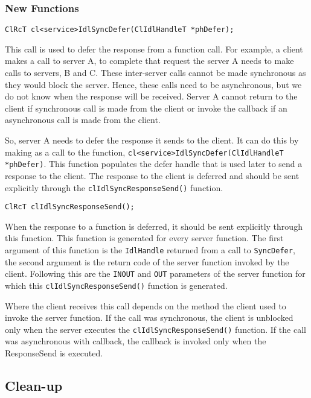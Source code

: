 \begin{flushleft}
\begin{enumerate}
\end{enumerate}

\subsubsection{New Functions}
{\tt{ClRcT cl<service>IdlSyncDefer(ClIdlHandleT *phDefer);}}
\par
This call is used to defer the response from a function call. For example, a client makes a call to server A, to complete that request the server A 
needs to make calls to servers, B and C. These inter-server calls cannot be made synchronous as they would block the server. Hence, these calls need to be 
asynchronous, but we do not know when the response will be received. Server A cannot return to the client if synchronous call is made from the client 
or invoke the callback if an asynchronous call is made from the client.
\par
So, server A needs to defer the response it sends to the client. It can do this by making as a call to the function, 
{\tt{cl<service>IdlSyncDefer(ClIdlHandleT *phDefer)}}. This function populates the defer handle that is used later to send a response to the 
client. The response to the client is deferred and should be sent explicitly through the {\tt{clIdlSyncResponseSend()}} function.
\par

{\tt{ClRcT clIdlSyncResponseSend();}}

\par	
	When the response to a function is deferred, it should be sent explicitly through this function.
This function is generated for every server function. The first argument of this function is the {\tt{IdlHandle}} returned from a call to 
{\tt{SyncDefer}}, the second argument is the return code of the server function invoked by the client. Following this are the {\tt{INOUT}} and {\tt{OUT}}
parameters of the server function for which this {\tt{clIdlSyncResponseSend()}} function is generated.\par
	Where the client receives this call depends on the method the client used to invoke the server function. If the call was synchronous, the client 
	is unblocked only when the server executes the {\tt{clIdlSyncResponseSend()}} function. If the call was asynchronous with callback, the callback is invoked only when the ResponseSend 
	is executed.




\subsection{Clean-up}


\end{flushleft}
